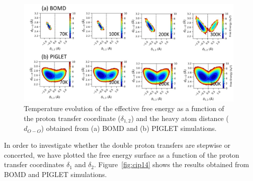 
\begin{figure}[!ht]
    \centering
    \includegraphics[width=16cm ]{./Appendix4/new_figures_si/figure_13.jpg}
    \caption{Temperature evolution of the effective free energy as a function of the proton transfer coordinate ($\delta_{1,2}$) and the heavy atom distance ($d_{O-O}$) obtained from (a) BOMD and (b) PIGLET simulations.}
    \label{fig:cip13}
\end{figure}

In order to investigate whether the double proton transfers are
stepwise or concerted, we have plotted the free energy surface as a function
of the proton transfer coordinates $\delta_1$ and $\delta_2$. Figure~\ref{fig:cip14}
shows the results obtained from BOMD and PIGLET simulations.



